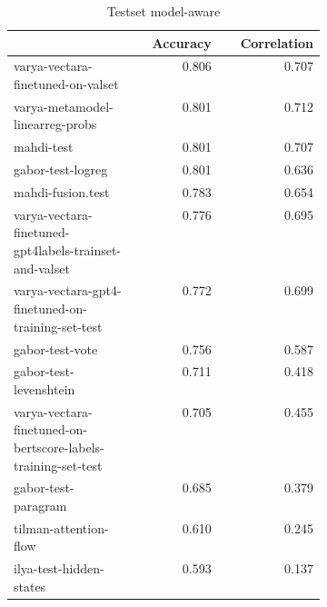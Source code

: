 \begin{table}
\centering
\caption{Testset model-aware}
\label{test-aware}
\begin{tabular}{|p{0.4\linewidth}|r|r|}
\hline
 & Accuracy & Correlation \\
\hline
varya-vectara-finetuned-on-valset & 0.806 & 0.707 \\
\cline{1-3}
varya-metamodel-linearreg-probs & 0.801 & 0.712 \\
\cline{1-3}
mahdi-test & 0.801 & 0.707 \\
\cline{1-3}
gabor-test-logreg & 0.801 & 0.636 \\
\cline{1-3}
mahdi-fusion.test & 0.783 & 0.654 \\
\cline{1-3}
varya-vectara-finetuned-gpt4labels-trainset-and-valset & 0.776 & 0.695 \\
\cline{1-3}
varya-vectara-gpt4-finetuned-on-training-set-test & 0.772 & 0.699 \\
\cline{1-3}
gabor-test-vote & 0.756 & 0.587 \\
\cline{1-3}
gabor-test-levenshtein & 0.711 & 0.418 \\
\cline{1-3}
varya-vectara-finetuned-on-bertscore-labels-training-set-test & 0.705 & 0.455 \\
\cline{1-3}
gabor-test-paragram & 0.685 & 0.379 \\
\cline{1-3}
tilman-attention-flow & 0.610 & 0.245 \\
\cline{1-3}
ilya-test-hidden-states & 0.593 & 0.137 \\
\cline{1-3}
\hline
\end{tabular}
\end{table}
